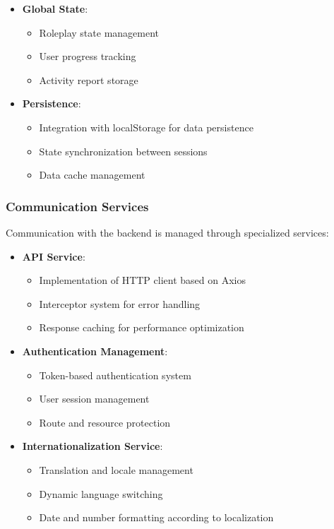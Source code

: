 \begin{itemize}
	\item \textbf{Global State}:
	      \begin{itemize}
		      \item Roleplay state management
		      \item User progress tracking
		      \item Activity report storage
	      \end{itemize}

	\item \textbf{Persistence}:
	      \begin{itemize}
		      \item Integration with localStorage for data persistence
		      \item State synchronization between sessions
		      \item Data cache management
	      \end{itemize}
\end{itemize}

\subsubsection{Communication Services}
\label{servicios-comunicacion}

Communication with the backend is managed through specialized services:

\begin{itemize}
	\item \textbf{API Service}:
	      \begin{itemize}
		      \item Implementation of HTTP client based on Axios
		      \item Interceptor system for error handling
		      \item Response caching for performance optimization
	      \end{itemize}

	\item \textbf{Authentication Management}:
	      \begin{itemize}
		      \item Token-based authentication system
		      \item User session management
		      \item Route and resource protection
	      \end{itemize}

	\item \textbf{Internationalization Service}:
	      \begin{itemize}
		      \item Translation and locale management
		      \item Dynamic language switching
		      \item Date and number formatting according to localization
	      \end{itemize}
\end{itemize}


